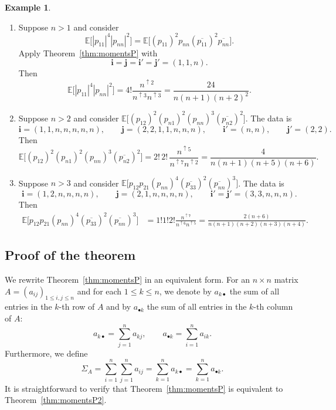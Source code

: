 \documentclass[10pt,a4paper]{amsart}
\numberwithin{equation}{section}
\theoremstyle{definition}
\newtheorem{Example}[Theorem]{Example}
\begin{document}
\begin{Example}\label{ex:momentsP_examples}\quad
\begin{enumerate}\itemsep=0pt
\item Suppose $n>1$ and consider
\[
\mathbb{E} \bigl[|p_{11}|^4 |p_{nn}|^2\bigr]
=\mathbb{E}\bigl[(p_{11})^2 p_{nn} (\overline{p_{11}})^2 \overline{p_{nn}}\bigr].
\]
Apply Theorem~\ref{thm:momentsP} with
\[
\bm{i} =\bm{j}=\bm{i}'=\bm{j}'=(1,1,n).
\]
Then
\[
\mathbb{E} \bigl[|p_{11}|^4 |p_{nn}|^2\bigr] =4! \frac{n^{\uparrow 2}}{n^{\uparrow 3} n^{\uparrow 3}}
= \frac{24}{n(n+1) (n+2)^2}.
\]
\item Suppose $n>2$ and
consider $\mathbb{E}\bigl[(p_{12})^2 (p_{n1})^2(p_{nn})^3 (\overline{p_{n2}})^2 \bigr]$.
The data is
\[
\bm{i}=(1,1,n,n,n,n,n), \qquad \bm{j}=(2,2,1,1,n,n,n), \qquad \bm{i}'=(n,n), \qquad \bm{j}'=(2,2).
\]
Then
\[
\mathbb{E}\bigl[(p_{12})^2 (p_{n1})^2(p_{nn})^3 (\overline{p_{n2}})^2 \bigr]
= 2! \, 2! \, \frac{n^{\uparrow 5}}{n^{\uparrow 7} n^{\uparrow 2}}
= \frac{4}{n(n+1)(n+5)(n+6)}.
\]
\item Suppose $n>3$ and consider $\mathbb{E} \bigl[p_{12} p_{21} (p_{nn})^4 (\overline{p_{33}})^2
(\overline{p_{nn}})^3\bigr]$.
The data is
\[
\bm{i}=(1,2,n,n,n,n), \qquad \bm{j}=(2,1,n,n,n,n), \qquad \bm{i}'= \bm{j}'=(3,3,n,n,n).
\]
Then
\begin{align*}
\mathbb{E} \bigl[p_{12} p_{21} (p_{nn})^4 (\overline{p_{33}})^2
(\overline{p_{nn}})^3\bigr] &= 1! 1! 2! \frac{n^{\uparrow 7}}{n^{\uparrow 6} n^{\uparrow 5}}
 =
\frac{2(n+6)}{n(n+1)(n+2)(n+3)(n+4)}.
\end{align*}
\end{enumerate}
\end{Example}


\subsection{Proof of the theorem}

We rewrite Theorem~\ref{thm:momentsP} in an equivalent form.
For an $n \times n$ matrix $A=(a_{ij})_{1 \le i,j \le n}$ and for each $1 \le k \le n$,
we denote by $a_{k \bullet}$ the sum of all entries in the $k$-th row of $A$
and by $a_{\bullet k}$ the sum of all entries in the $k$-th column of $A$:
\[
a_{k \bullet} = \sum_{j=1}^n a_{kj}, \qquad a_{\bullet k} = \sum_{i=1}^n a_{ik}.
\]
Furthermore, we define
\[
\Sigma_A = \sum_{i=1}^n \sum_{j=1}^n a_{ij} = \sum_{k=1}^n a_{k \bullet} = \sum_{k=1}^n a_{\bullet k}.
\]
It is straightforward to verify that Theorem~\ref{thm:momentsP} is equivalent to Theorem~\ref{thm:momentsP2}.
\end{document}

